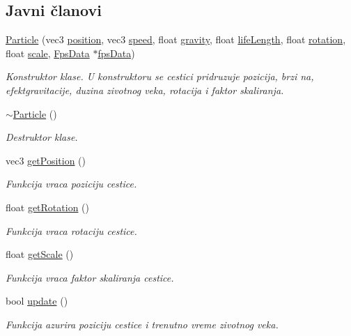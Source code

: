 \subsection*{Javni članovi}
\begin{DoxyCompactItemize}
\item 
\hyperlink{classparticle_1_1Particle_afb9da92466e6c043e69d0d5fb4e9a04f}{Particle} (vec3 \hyperlink{classparticle_1_1Particle_adbbe15e722e36d8933f228891b6e9d68}{position}, vec3 \hyperlink{classparticle_1_1Particle_a24b42fc49ed65250499e0ba059764f0c}{speed}, float \hyperlink{classparticle_1_1Particle_ae600a9dd750175cc63e19ddc826e7ce2}{gravity}, float \hyperlink{classparticle_1_1Particle_a5489d20fe4168e0fda5b58b3802a9003}{life\+Length}, float \hyperlink{classparticle_1_1Particle_a8ca9da0e74a86eced58a66db613a59a5}{rotation}, float \hyperlink{classparticle_1_1Particle_ae33238d14fd210a1d8336e568a456960}{scale}, \hyperlink{classutility_1_1FpsData}{Fps\+Data} $\ast$\hyperlink{classparticle_1_1Particle_a84e6c4f5fbc007346f27db18dd696045}{fps\+Data})
\begin{DoxyCompactList}\small\item\em Konstruktor klase. U konstruktoru se cestici pridruzuje pozicija, brzi na, efektgravitacije, duzina zivotnog veka, rotacija i faktor skaliranja. \end{DoxyCompactList}\item 
\hyperlink{classparticle_1_1Particle_a7cc19695c515e8cffa9f4d9929ca9e61}{$\sim$\+Particle} ()
\begin{DoxyCompactList}\small\item\em Destruktor klase. \end{DoxyCompactList}\item 
vec3 \hyperlink{classparticle_1_1Particle_a8dc9962f0f373739437652fbe8c5820d}{get\+Position} ()
\begin{DoxyCompactList}\small\item\em Funkcija vraca poziciju cestice. \end{DoxyCompactList}\item 
float \hyperlink{classparticle_1_1Particle_a0a9002e65ea2db2f9e28935d3e3e9aa5}{get\+Rotation} ()
\begin{DoxyCompactList}\small\item\em Funkcija vraca rotaciju cestice. \end{DoxyCompactList}\item 
float \hyperlink{classparticle_1_1Particle_a1de9470fa01253971c9f6ed0f5849b66}{get\+Scale} ()
\begin{DoxyCompactList}\small\item\em Funkcija vraca faktor skaliranja cestice. \end{DoxyCompactList}\item 
bool \hyperlink{classparticle_1_1Particle_ae64c03b4dd9a95879c0fee100955a800}{update} ()
\begin{DoxyCompactList}\small\item\em Funkcija azurira poziciju cestice i trenutno vreme zivotnog veka. \end{DoxyCompactList}\end{DoxyCompactItemize}
